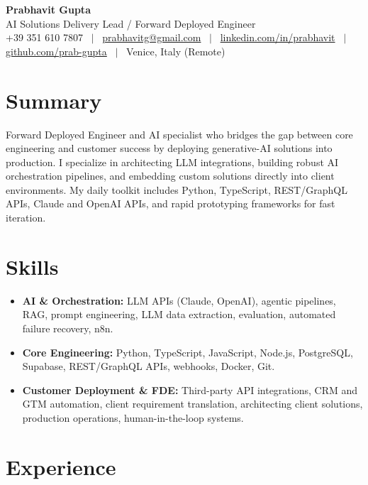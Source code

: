 \documentclass[a4paper,10pt]{article}
\begin{document}
\begin{center}
 {\Huge\bfseries Prabhavit Gupta}\\[4pt]
 {\color{accent}\Large AI Solutions Delivery Lead / Forward Deployed Engineer}\\[6pt]
 {\small +39 351 610 7807 ~$\vert$~
 \href{mailto:prabhavitg@gmail.com}{prabhavitg@gmail.com} ~$\vert$~
 \href{https://www.linkedin.com/in/prabhavit/}{linkedin.com/in/prabhavit} ~$\vert$~
 \href{https://github.com/prab-gupta}{github.com/prab-gupta} ~$\vert$~
 Venice, Italy (Remote)}
\end{center}
\vspace{4pt}

\section{Summary}
Forward Deployed Engineer and AI specialist who bridges the gap between core engineering and customer success by deploying generative-AI solutions into production. I specialize in architecting LLM integrations, building robust AI orchestration pipelines, and embedding custom solutions directly into client environments. My daily toolkit includes Python, TypeScript, REST/GraphQL APIs, Claude and OpenAI APIs, and rapid prototyping frameworks for fast iteration.

\section{Skills}
\begin{itemize}
 \item \textbf{AI \& Orchestration:} LLM APIs (Claude, OpenAI), agentic pipelines, RAG, prompt engineering, LLM data extraction, evaluation, automated failure recovery, n8n.
 \item \textbf{Core Engineering:} Python, TypeScript, JavaScript, Node.js, PostgreSQL, Supabase, REST/GraphQL APIs, webhooks, Docker, Git.
 \item \textbf{Customer Deployment \& FDE:} Third-party API integrations, CRM and GTM automation, client requirement translation, architecting client solutions, production operations, human-in-the-loop systems.
\end{itemize}

\section{Experience}
\end{document}
